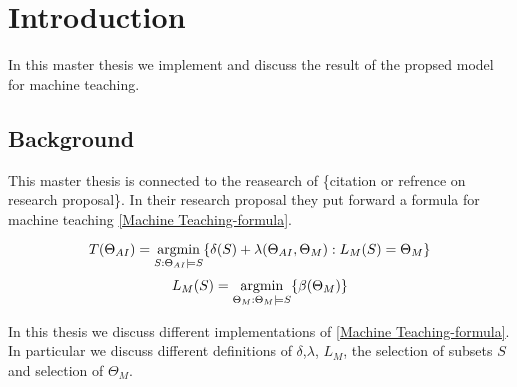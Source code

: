 \chapter{Introduction}

In this master thesis we implement and discuss the result of the propsed model 
for machine teaching. 

\section{Background}
This master thesis is connected to the reasearch of \{citation or refrence on research proposal\}.
In their research proposal they put forward a formula for machine teaching \ref{Machine Teaching-formula}. 

\begin{equation}
    \label{Machine Teaching-formula}
    \centering
    T(\Theta_{AI})=\argmin_{S: \Theta_{AI} \models S} \{\delta(S)+\lambda (\Theta_{AI}, \Theta_M):L_M(S)=\Theta_M\}
\end{equation}
\begin{equation}
    \label{LM-formula}
    \centering
    L_M(S)=\argmin_{\Theta_M :\Theta_M \models S} \{\beta(\Theta_M)\}
\end{equation}

In this thesis we discuss different implementations of \ref{Machine Teaching-formula}. In particular we discuss
different definitions of $\delta$,$\lambda$, $L_M$, the selection of subsets $S$ and selection of $\Theta_M$.

